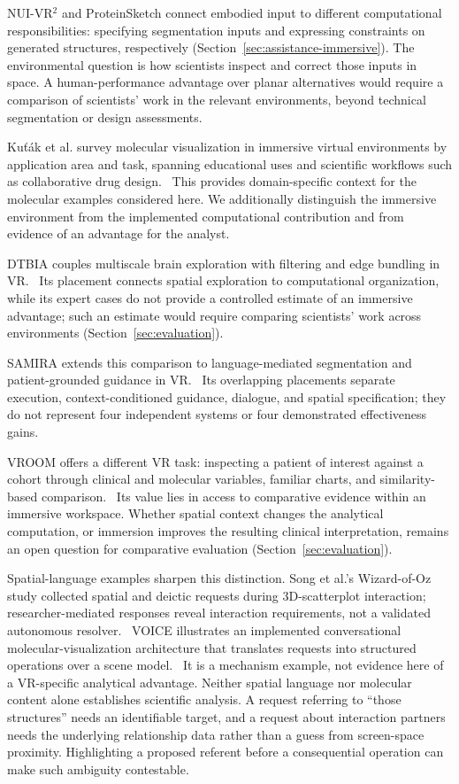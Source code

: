 NUI-VR$^2$ and ProteinSketch connect embodied input to different computational responsibilities: specifying segmentation inputs and expressing constraints on generated structures, respectively (Section~\ref{sec:assistance-immersive}). The environmental question is how scientists inspect and correct those inputs in space. A human-performance advantage over planar alternatives would require a comparison of scientists' work in the relevant environments, beyond technical segmentation or design assessments.

Ku\v{t}\'{a}k et al. survey molecular visualization in immersive virtual environments by application area and task, spanning educational uses and scientific workflows such as collaborative drug design.~\cite{kutak2023molecular} This provides domain-specific context for the molecular examples considered here. We additionally distinguish the immersive environment from the implemented computational contribution and from evidence of an advantage for the analyst.

DTBIA couples multiscale brain exploration with filtering and edge bundling in VR.~\cite{MapDTBIA} Its placement connects spatial exploration to computational organization, while its expert cases do not provide a controlled estimate of an immersive advantage; such an estimate would require comparing scientists' work across environments (Section~\ref{sec:evaluation}).

SAMIRA extends this comparison to language-mediated segmentation and patient-grounded guidance in VR.~\cite{MapSAMIRA} Its overlapping placements separate execution, context-conditioned guidance, dialogue, and spatial specification; they do not represent four independent systems or four demonstrated effectiveness gains.

VROOM offers a different VR task: inspecting a patient of interest against a cohort through clinical and molecular variables, familiar charts, and similarity-based comparison.~\cite{ExpansionX032} Its value lies in access to comparative evidence within an immersive workspace. Whether spatial context changes the analytical computation, or immersion improves the resulting clinical interpretation, remains an open question for comparative evaluation (Section~\ref{sec:evaluation}).

Spatial-language examples sharpen this distinction. Song et al.'s Wizard-of-Oz study collected spatial and deictic requests during 3D-scatterplot interaction; researcher-mediated responses reveal interaction requirements, not a validated autonomous resolver.~\cite{SongEmbodiedNLI} VOICE illustrates an implemented conversational molecular-visualization architecture that translates requests into structured operations over a scene model.~\cite{VOICE} It is a mechanism example, not evidence here of a VR-specific analytical advantage. Neither spatial language nor molecular content alone establishes scientific analysis. A request referring to ``those structures'' needs an identifiable target, and a request about interaction partners needs the underlying relationship data rather than a guess from screen-space proximity. Highlighting a proposed referent before a consequential operation can make such ambiguity contestable.

